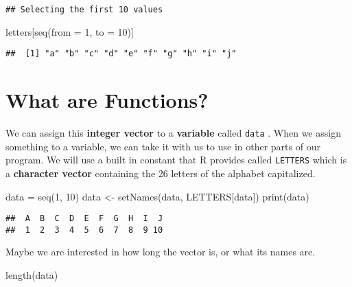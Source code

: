 \documentclass[
]{book}
\newenvironment{Shaded}{\begin{snugshade}}{\end{snugshade}}
\newcommand{\AttributeTok}[1]{\textcolor[rgb]{0.77,0.63,0.00}{#1}}
\newcommand{\DecValTok}[1]{\textcolor[rgb]{0.00,0.00,0.81}{#1}}
\newcommand{\FunctionTok}[1]{\textcolor[rgb]{0.00,0.00,0.00}{#1}}
\newcommand{\NormalTok}[1]{#1}
\newcommand{\OtherTok}[1]{\textcolor[rgb]{0.56,0.35,0.01}{#1}}
\begin{document}
\begin{verbatim}
## Selecting the first 10 values
\end{verbatim}

\begin{Shaded}
\begin{Highlighting}[]
\NormalTok{letters[}\FunctionTok{seq}\NormalTok{(}\AttributeTok{from =} \DecValTok{1}\NormalTok{, }\AttributeTok{to =} \DecValTok{10}\NormalTok{)]}
\end{Highlighting}
\end{Shaded}

\begin{verbatim}
##  [1] "a" "b" "c" "d" "e" "f" "g" "h" "i" "j"
\end{verbatim}

\hypertarget{what-are-functions}{%
\section{What are Functions?}\label{what-are-functions}}

We can assign this \textbf{integer vector} to a \textbf{variable} called \texttt{data} . When we assign something to a variable, we can take it with us to use in other parts of our program. We will use a built in constant that R provides called \texttt{LETTERS} which is a \textbf{character vector} containing the 26 letters of the alphabet capitalized.

\begin{Shaded}
\begin{Highlighting}[]
\NormalTok{data }\OtherTok{=} \FunctionTok{seq}\NormalTok{(}\DecValTok{1}\NormalTok{, }\DecValTok{10}\NormalTok{)}
\NormalTok{data }\OtherTok{\textless{}{-}} \FunctionTok{setNames}\NormalTok{(data, LETTERS[data])}
\FunctionTok{print}\NormalTok{(data)}
\end{Highlighting}
\end{Shaded}

\begin{verbatim}
##  A  B  C  D  E  F  G  H  I  J 
##  1  2  3  4  5  6  7  8  9 10
\end{verbatim}

Maybe we are interested in how long the vector is, or what its names are.

\begin{Shaded}
\begin{Highlighting}[]
\FunctionTok{length}\NormalTok{(data)}
\end{Highlighting}
\end{Shaded}
\end{document}
